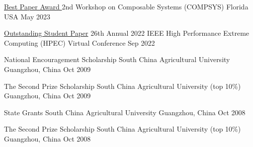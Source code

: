 



\begin{cvhonors}

  \cvhonor
    {\href{https://compsysworkshop.github.io/compsys23/program.html}{Best Paper Award
}} %
    {2nd Workshop on Composable Systems (COMPSYS)} %
    {Florida USA} %
    {May 2023} %

  \cvhonor
    {\href{https://ieee-hpec.org/index.php/ieee-hpec-2022-prelim-agenda/}{Outstanding Student Paper}} %
    {26th Annual 2022 IEEE High Performance Extreme Computing (HPEC)} %
    {Virtual Conference} %
    {Sep 2022} %

  \cvhonor
    {National Encouragement Scholarship} %
    {South China Agricultural University} %
    {Guangzhou, China} %
    {Oct 2009} %

  \cvhonor
    {The Second Prize Scholarship} %
    {South China Agricultural University (top 10\%)} %
    {Guangzhou, China} %
    {Oct 2009} %

  \cvhonor
    {State Grants} %
    {South China Agricultural University} %
    {Guangzhou, China} %
    {Oct 2008} %

  \cvhonor
    {The Second Prize Scholarship} %
    {South China Agricultural University (top 10\%)} %
    {Guangzhou, China} %
    {Oct 2008} %

\end{cvhonors}
